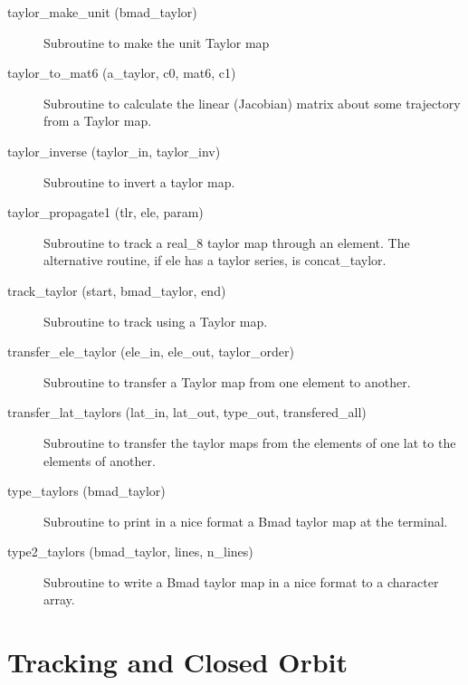 \begin{description}
\item[taylor_make_unit (bmad_taylor)] \Newline
Subroutine to make the unit Taylor map

\item[taylor_to_mat6 (a_taylor, c0, mat6, c1)] \Newline
Subroutine to calculate the linear (Jacobian) matrix about some
trajectory from a Taylor map.

\item[taylor_inverse (taylor_in, taylor_inv)] \Newline
Subroutine to invert a taylor map. 

\item[taylor_propagate1 (tlr, ele, param)] \Newline
Subroutine to track a real_8 taylor map through an element. 
The alternative routine, if ele has a taylor series, is concat_taylor. 

\item[track_taylor (start, bmad_taylor, end)] \Newline
Subroutine to track using a Taylor map. 

\item[transfer_ele_taylor (ele_in, ele_out, taylor_order)] \Newline 
Subroutine to transfer a Taylor map from one element to another.

\item[transfer_lat_taylors (lat_in, lat_out, 
                                             type_out, transfered_all) ] \Newline 
Subroutine to transfer the taylor maps from the elements of one lat to
the elements of another. 

\item[type_taylors (bmad_taylor)] \Newline
Subroutine to print in a nice format a Bmad taylor map at the terminal. 

\item[type2_taylors (bmad_taylor, lines, n_lines)] \Newline
Subroutine to write a Bmad taylor map in a nice format to a character array. 

\end{description}

\section{Tracking and Closed Orbit}
\label{r:track}    

